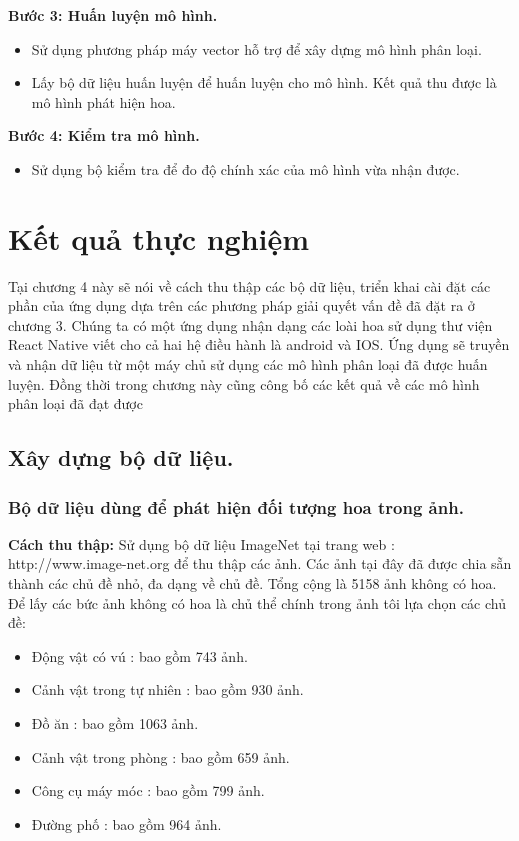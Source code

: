 \documentclass[12pt]{report}
\begin{document}
		\textbf{Bước 3: Huấn luyện mô hình.} 
		\begin{itemize}
			\item Sử dụng phương pháp máy vector hỗ trợ để xây dựng mô hình phân loại.
			\item Lấy bộ dữ liệu huấn luyện để huấn luyện cho mô hình. Kết quả thu được là mô hình phát hiện hoa.
		\end{itemize}
						
		\textbf{Bước 4: Kiểm tra mô hình.} 
		\begin{itemize}
			\item Sử dụng bộ kiểm tra để đo độ chính xác của mô hình vừa nhận được.
		\end{itemize}
							
		\chapter{Kết quả thực nghiệm}
		\label{chap:Experimental results}
		Tại chương 4 này sẽ nói về cách thu thập các bộ dữ liệu, triển khai cài đặt các phần của ứng dụng dựa trên các phương pháp giải quyết vấn đề đã đặt ra ở chương 3. Chúng ta có một ứng dụng nhận dạng các loài hoa sử dụng thư viện React Native viết cho cả hai hệ điều hành là android và IOS. Ứng dụng sẽ truyền và nhận dữ liệu từ một máy chủ sử dụng các mô hình phân loại đã được huấn luyện. Đồng thời trong chương này cũng công bố các kết quả về các mô hình phân loại đã đạt được
						
		\section{Xây dựng bộ dữ liệu.}
		\subsection{Bộ dữ liệu dùng để phát hiện đối tượng hoa trong ảnh.}
						
		\textbf{Cách thu thập:} Sử dụng bộ dữ liệu ImageNet tại trang web : http://www.image-net.org để thu thập các ảnh. Các ảnh tại đây đã được chia sẵn thành các chủ đề nhỏ, đa dạng về chủ đề. Tổng cộng là 5158 ảnh không có hoa. Để lấy các bức ảnh không có hoa là chủ thể chính trong ảnh tôi lựa chọn các chủ đề: 
		\begin{itemize}
			\item Động vật có vú		: bao gồm 743 ảnh.
			\item Cảnh vật trong tự nhiên	: bao gồm 930 ảnh.
			\item Đồ ăn			: bao gồm 1063 ảnh.
			\item Cảnh vật trong phòng	: bao gồm 659 ảnh.
			\item Công cụ máy móc		: bao gồm 799 ảnh.
			\item Đường phố			: bao gồm 964 ảnh.
		\end{itemize}	
							
\end{document}
